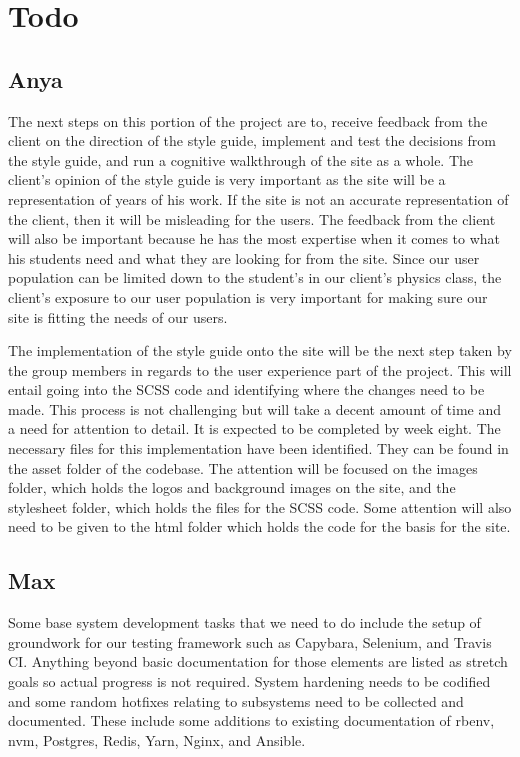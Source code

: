 \documentclass[onecolumn, draftclsnofoot,10pt, compsoc]{IEEEtran}
\begin{document}
\section{Todo}
\subsection{Anya}
The next steps on this portion of the project are to, receive feedback from the client on the direction of the style guide, implement and test the decisions from the style guide, and run a cognitive walkthrough of the site as a whole. The client’s opinion of the style guide is very important as the site will be a representation of years of his work. If the site is not an accurate representation of the client, then it will be misleading for the users. The feedback from the client will also be important because he has the most expertise when it comes to what his students need and what they are looking for from the site. Since our user population can be limited down to the student’s in our client’s physics class, the client’s exposure to our user population is very important for making sure our site is fitting the needs of our users.

The implementation of the style guide onto the site will be the next step taken by the group members in regards to the user experience part of the project. This will entail going into the SCSS code and identifying where the changes need to be made. This process is not challenging but will take a decent amount of time and a need for attention to detail. It is expected to be completed by week eight. The necessary files for this implementation have been identified. They can be found in the asset folder of the codebase. The attention will be focused on the images folder, which holds the logos and background images on the site, and the stylesheet folder, which holds the files for the SCSS code. Some attention will also need to be given to the html folder which holds the code for the basis for the site.

\subsection{Max}
Some base system development tasks that we need to do include the setup of groundwork for our testing framework such as Capybara, Selenium, and Travis CI. Anything beyond basic documentation for those elements are listed as stretch goals so actual progress is not required. System hardening needs to be codified and some random hotfixes relating to subsystems need to be collected and documented. These include some additions to existing documentation of rbenv, nvm, Postgres, Redis, Yarn, Nginx, and Ansible.
\end{document}
